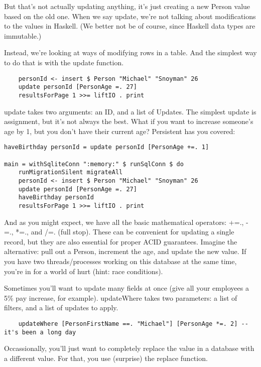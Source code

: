 But that's not actually updating anything, it's just creating a new Person value based on the old one. When we say update, we're not talking about modifications to the values in Haskell. (We better not be of course, since Haskell data types are immutable.)

Instead, we're looking at ways of modifying rows in a table. And the simplest way to do that is with the update function.

\begin{lstlisting}
    personId <- insert $ Person "Michael" "Snoyman" 26
    update personId [PersonAge =. 27]
    resultsForPage 1 >>= liftIO . print
\end{lstlisting}%

update takes two arguments: an ID, and a list of Updates. The simplest update is assignment, but it's not always the best. What if you want to increase someone's age by 1, but you don't have their current age? Persistent has you covered:

\begin{lstlisting}
haveBirthday personId = update personId [PersonAge +=. 1]

main = withSqliteConn ":memory:" $ runSqlConn $ do
    runMigrationSilent migrateAll
    personId <- insert $ Person "Michael" "Snoyman" 26
    update personId [PersonAge =. 27]
    haveBirthday personId
    resultsForPage 1 >>= liftIO . print
\end{lstlisting}%

And as you might expect, we have all the basic mathematical operators: +=., -=., *=., and /=. (full stop). These can be convenient for updating a single record, but they are also essential for proper ACID guarantees. Imagine the alternative: pull out a Person, increment the age, and update the new value. If you have two threads/processes working on this database at the same time, you're in for a world of hurt (hint: race conditions).

Sometimes you'll want to update many fields at once (give all your employees a 5\% pay increase, for example). updateWhere takes two parameters: a list of filters, and a list of updates to apply.

\begin{lstlisting}
    updateWhere [PersonFirstName ==. "Michael"] [PersonAge *=. 2] -- it's been a long day
\end{lstlisting}

Occassionally, you'll just want to completely replace the value in a database with a different value. For that, you use (surprise) the replace function.

